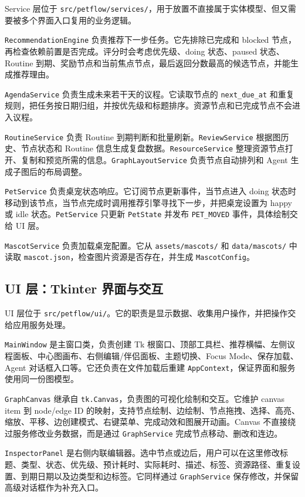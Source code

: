 \documentclass[UTF8,a4paper,12pt,fontset=none]{ctexart}
\begin{document}
Service 层位于 \texttt{src/petflow/services/}，用于放置不直接属于实体模型、但又需要被多个界面入口复用的业务逻辑。

\texttt{RecommendationEngine} 负责推荐下一步任务。它先排除已完成和 blocked 节点，再检查依赖前置是否完成。评分时会考虑优先级、doing 状态、paused 状态、Routine 到期、奖励节点和当前焦点节点，最后返回分数最高的候选节点，并能生成推荐理由。

\texttt{AgendaService} 负责生成未来若干天的议程。它读取节点的 \texttt{next\_due\_at} 和重复规则，把任务按日期归组，并按优先级和标题排序。资源节点和已完成节点不会进入议程。

\texttt{RoutineService} 负责 Routine 到期判断和批量刷新。\texttt{ReviewService} 根据图历史、节点状态和 Routine 信息生成复盘数据。\texttt{ResourceService} 整理资源节点打开、复制和预览所需的信息。\texttt{GraphLayoutService} 负责节点自动排列和 Agent 生成子图后的布局调整。

\texttt{PetService} 负责桌宠状态响应。它订阅节点更新事件，当节点进入 doing 状态时移动到该节点，当节点完成时调用推荐引擎寻找下一步，并把桌宠设置为 happy 或 idle 状态。\texttt{PetService} 只更新 \texttt{PetState} 并发布 \texttt{PET\_MOVED} 事件，具体绘制交给 UI 层。

\texttt{MascotService} 负责加载桌宠配置。它从 \texttt{assets/mascots/} 和 \texttt{data/mascots/} 中读取 \texttt{mascot.json}，检查图片资源是否存在，并生成 \texttt{MascotConfig}。

\subsection{UI 层：Tkinter 界面与交互}

UI 层位于 \texttt{src/petflow/ui/}。它的职责是显示数据、收集用户操作，并把操作交给应用服务处理。

\texttt{MainWindow} 是主窗口类，负责创建 Tk 根窗口、顶部工具栏、推荐横幅、左侧议程面板、中心图画布、右侧编辑/伴侣面板、主题切换、Focus Mode、保存加载、Agent 对话框入口等。它还负责在文件加载后重建 \texttt{AppContext}，保证界面和服务使用同一份图模型。

\texttt{GraphCanvas} 继承自 \texttt{tk.Canvas}，负责图的可视化绘制和交互。它维护 canvas item 到 node/edge ID 的映射，支持节点绘制、边绘制、节点拖拽、选择、高亮、缩放、平移、边创建模式、右键菜单、完成动效和图展开动画。Canvas 不直接绕过服务修改业务数据，而是通过 \texttt{GraphService} 完成节点移动、删改和连边。

\texttt{InspectorPanel} 是右侧内联编辑器。选中节点或边后，用户可以在这里修改标题、类型、状态、优先级、预计耗时、实际耗时、描述、标签、资源路径、重复设置、到期日期以及边类型和边标签。它同样通过 \texttt{GraphService} 保存修改，并保留高级对话框作为补充入口。
\end{document}
